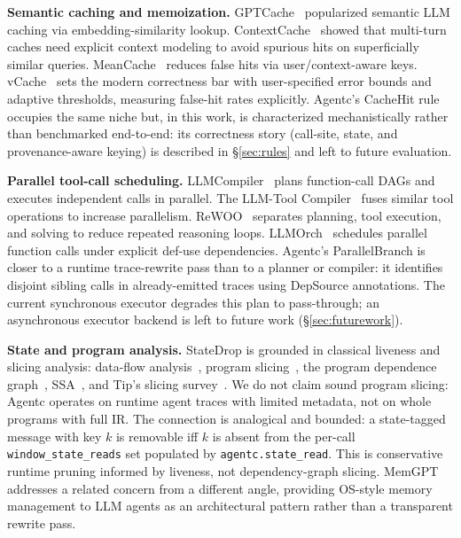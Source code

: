 \textbf{Semantic caching and memoization.} GPTCache~\cite{bang2023gptcache}
popularized semantic LLM caching via embedding-similarity lookup.
ContextCache~\cite{yan2025contextcache} showed that multi-turn caches need explicit
context modeling to avoid spurious hits on superficially similar queries.
MeanCache~\cite{gill2025meancache} reduces false hits via user/context-aware keys.
vCache~\cite{schroeder2026vcache} sets the modern correctness bar with user-specified
error bounds and adaptive thresholds, measuring false-hit rates explicitly. Agentc's
CacheHit rule occupies the same niche but, in this work, is characterized
mechanistically rather than benchmarked end-to-end: its correctness story
(call-site, state, and provenance-aware keying) is described in \S\ref{sec:rules}
and left to future evaluation.

\textbf{Parallel tool-call scheduling.} LLMCompiler~\cite{kim2024llmcompiler} plans
function-call DAGs and executes independent calls in parallel. The LLM-Tool
Compiler~\cite{singh2024llmtoolcompiler} fuses similar tool operations to increase
parallelism. ReWOO~\cite{xu2023rewoo} separates planning, tool execution, and solving
to reduce repeated reasoning loops. LLMOrch~\cite{liu2026llmorch} schedules parallel
function calls under explicit def-use dependencies. Agentc's ParallelBranch is closer
to a runtime trace-rewrite pass than to a planner or compiler: it identifies disjoint
sibling calls in already-emitted traces using DepSource annotations. The current
synchronous executor degrades this plan to pass-through; an asynchronous executor
backend is left to future work (\S\ref{sec:futurework}).

\textbf{State and program analysis.} StateDrop is grounded in classical liveness and
slicing analysis: data-flow analysis~\cite{allen1976dataflow}, program
slicing~\cite{weiser1981slicing}, the program dependence graph~\cite{ferrante1987pdg},
SSA~\cite{cytron1991ssa}, and Tip's slicing survey~\cite{tip1995survey}. We do not
claim sound program slicing: Agentc operates on runtime agent traces with limited
metadata, not on whole programs with full IR. The connection is analogical and
bounded: a state-tagged message with key $k$ is removable iff $k$ is absent from the
per-call \texttt{window\_state\_reads} set populated by \texttt{agentc.state\_read}.
This is conservative runtime pruning informed by liveness, not dependency-graph
slicing. MemGPT~\cite{packer2023memgpt} addresses a related concern from a different
angle, providing OS-style memory management to LLM agents as an architectural pattern
rather than a transparent rewrite pass.

